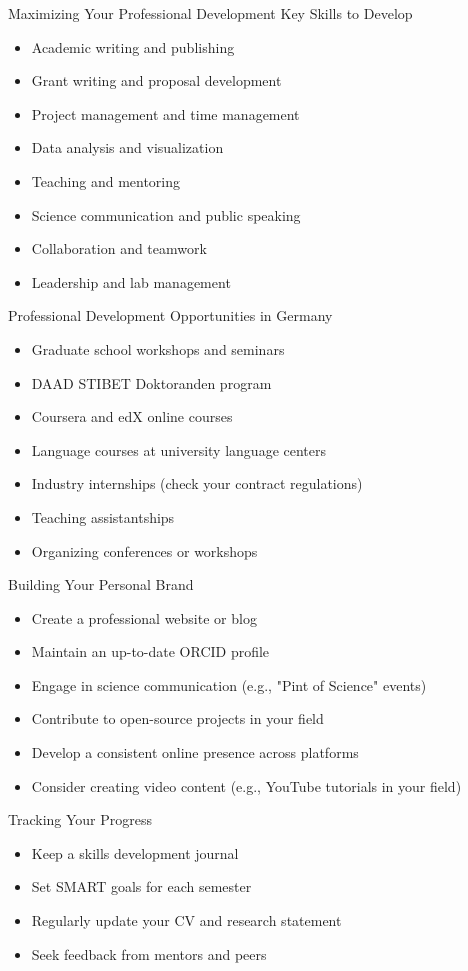 \documentclass[aspectratio=169,10pt]{beamer}
\begin{document}
\begin{frame}{Maximizing Your Professional Development}
\alert{Key Skills to Develop}
\begin{itemize}
    \item Academic writing and publishing
    \item Grant writing and proposal development
    \item Project management and time management
    \item Data analysis and visualization
    \item Teaching and mentoring
    \item Science communication and public speaking
    \item Collaboration and teamwork
    \item Leadership and lab management
\end{itemize}

\alert{Professional Development Opportunities in Germany}
\begin{itemize}
    \item Graduate school workshops and seminars
    \item DAAD STIBET Doktoranden program
    \item Coursera and edX online courses
    \item Language courses at university language centers
    \item Industry internships (check your contract regulations)
    \item Teaching assistantships
    \item Organizing conferences or workshops
\end{itemize}

\alert{Building Your Personal Brand}
\begin{itemize}
    \item Create a professional website or blog
    \item Maintain an up-to-date ORCID profile
    \item Engage in science communication (e.g., "Pint of Science" events)
    \item Contribute to open-source projects in your field
    \item Develop a consistent online presence across platforms
    \item Consider creating video content (e.g., YouTube tutorials in your field)
\end{itemize}

\alert{Tracking Your Progress}
\begin{itemize}
    \item Keep a skills development journal
    \item Set SMART goals for each semester
    \item Regularly update your CV and research statement
    \item Seek feedback from mentors and peers
\end{itemize}
\end{frame}
\end{document}
